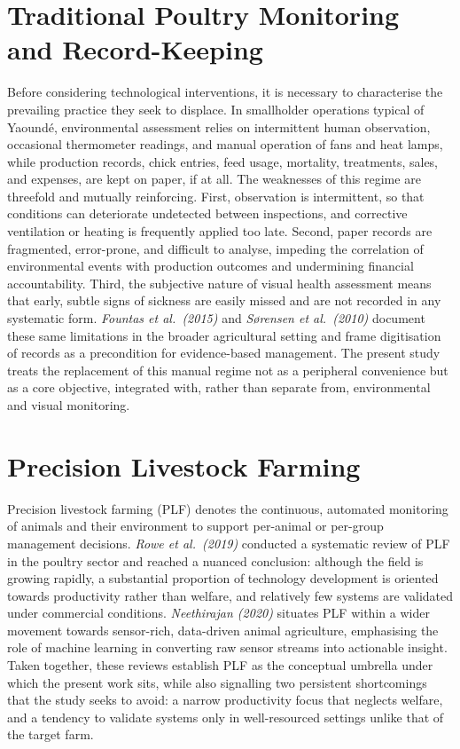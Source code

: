 \documentclass[12pt,a4paper]{report}
\begin{document}
\section{Traditional Poultry Monitoring and Record-Keeping}

Before considering technological interventions, it is necessary to characterise the prevailing practice they seek to displace. In smallholder operations typical of Yaound\'e, environmental assessment relies on intermittent human observation, occasional thermometer readings, and manual operation of fans and heat lamps, while production records, chick entries, feed usage, mortality, treatments, sales, and expenses, are kept on paper, if at all. The weaknesses of this regime are threefold and mutually reinforcing. First, observation is intermittent, so that conditions can deteriorate undetected between inspections, and corrective ventilation or heating is frequently applied too late. Second, paper records are fragmented, error-prone, and difficult to analyse, impeding the correlation of environmental events with production outcomes and undermining financial accountability. Third, the subjective nature of visual health assessment means that early, subtle signs of sickness are easily missed and are not recorded in any systematic form. \textit{Fountas et al.\ (2015)} and \textit{S{\o}rensen et al.\ (2010)} document these same limitations in the broader agricultural setting and frame digitisation of records as a precondition for evidence-based management. The present study treats the replacement of this manual regime not as a peripheral convenience but as a core objective, integrated with, rather than separate from, environmental and visual monitoring.

\section{Precision Livestock Farming}

Precision livestock farming (PLF) denotes the continuous, automated monitoring of animals and their environment to support per-animal or per-group management decisions. \textit{Rowe et al.\ (2019)} conducted a systematic review of PLF in the poultry sector and reached a nuanced conclusion: although the field is growing rapidly, a substantial proportion of technology development is oriented towards productivity rather than welfare, and relatively few systems are validated under commercial conditions. \textit{Neethirajan (2020)} situates PLF within a wider movement towards sensor-rich, data-driven animal agriculture, emphasising the role of machine learning in converting raw sensor streams into actionable insight. Taken together, these reviews establish PLF as the conceptual umbrella under which the present work sits, while also signalling two persistent shortcomings that the study seeks to avoid: a narrow productivity focus that neglects welfare, and a tendency to validate systems only in well-resourced settings unlike that of the target farm.
\end{document}
